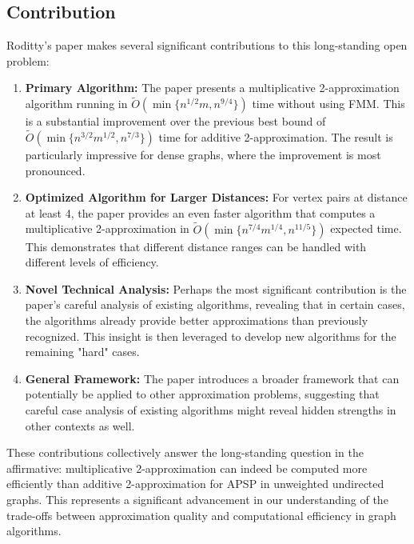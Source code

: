 \documentclass[a4paper,11pt,oneside]{book}
\begin{document}
\subsection{Contribution}
Roditty's paper makes several significant contributions to this long-standing open problem:
\begin{enumerate}
    \item \textbf{Primary Algorithm:} The paper presents a multiplicative 2-approximation algorithm running in $\tilde{O}(\min\{n^{1/2}m, n^{9/4}\})$ time without using FMM. This is a substantial improvement over the previous best bound of $\tilde{O}(\min\{n^{3/2}m^{1/2}, n^{7/3}\})$ time for additive 2-approximation. The result is particularly impressive for dense graphs, where the improvement is most pronounced.

    \item \textbf{Optimized Algorithm for Larger Distances:} For vertex pairs at distance at least 4, the paper provides an even faster algorithm that computes a multiplicative 2-approximation in $\tilde{O}(\min\{n^{7/4}m^{1/4}, n^{11/5}\})$ expected time. This demonstrates that different distance ranges can be handled with different levels of efficiency.

    \item \textbf{Novel Technical Analysis:} Perhaps the most significant contribution is the paper's careful analysis of existing algorithms, revealing that in certain cases, the algorithms already provide better approximations than previously recognized. This insight is then leveraged to develop new algorithms for the remaining "hard" cases.
    
    \item \textbf{General Framework:} The paper introduces a broader framework that can potentially be applied to other approximation problems, suggesting that careful case analysis of existing algorithms might reveal hidden strengths in other contexts as well.
\end{enumerate}

These contributions collectively answer the long-standing question in the affirmative: multiplicative 2-approximation can indeed be computed more efficiently than additive 2-approximation for APSP in unweighted undirected graphs. This represents a significant advancement in our understanding of the trade-offs between approximation quality and computational efficiency in graph algorithms.
\\
\\
\end{document}
